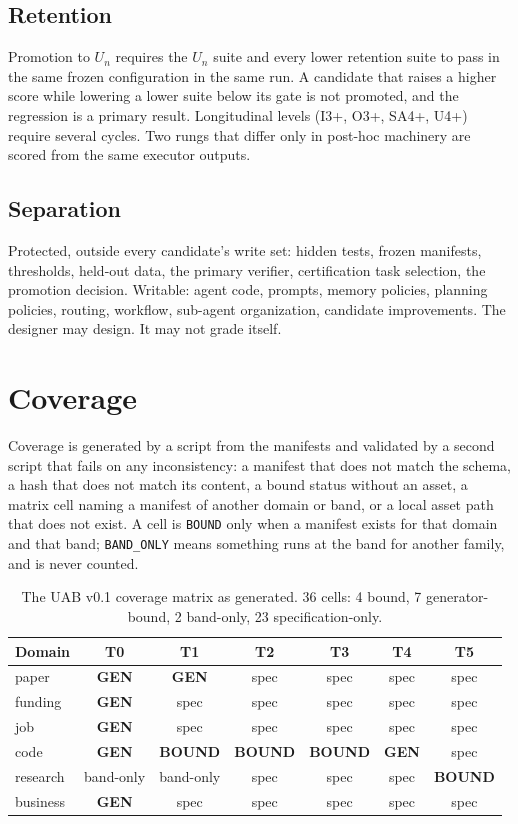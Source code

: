 \documentclass[11pt]{article}
\theoremstyle{definition}
\begin{document}
\subsection{Retention}

Promotion to $U_n$ requires the $U_n$ suite and every lower retention suite to pass in the same frozen configuration in the same run. A candidate that raises a higher score while lowering a lower suite below its gate is not promoted, and the regression is a primary result. Longitudinal levels (I3+, O3+, SA4+, U4+) require several cycles. Two rungs that differ only in post-hoc machinery are scored from the same executor outputs.

\subsection{Separation}

Protected, outside every candidate's write set: hidden tests, frozen manifests, thresholds, held-out data, the primary verifier, certification task selection, the promotion decision. Writable: agent code, prompts, memory policies, planning policies, routing, workflow, sub-agent organization, candidate improvements. The designer may design. It may not grade itself.

\section{Coverage}\label{sec:coverage}

Coverage is generated by a script from the manifests and validated by a second script that fails on any inconsistency: a manifest that does not match the schema, a hash that does not match its content, a bound status without an asset, a matrix cell naming a manifest of another domain or band, or a local asset path that does not exist. A cell is \texttt{BOUND} only when a manifest exists for that domain and that band; \texttt{BAND\_ONLY} means something runs at the band for another family, and is never counted.

\begin{table}[H]
\centering\small
\begin{tabularx}{\textwidth}{@{}lcccccc@{}}
\toprule
Domain & T0 & T1 & T2 & T3 & T4 & T5 \\
\midrule
paper & \textbf{GEN} & \textbf{GEN} & spec & spec & spec & spec \\
funding & \textbf{GEN} & spec & spec & spec & spec & spec \\
job & \textbf{GEN} & spec & spec & spec & spec & spec \\
code & \textbf{GEN} & \textbf{BOUND} & \textbf{BOUND} & \textbf{BOUND} & \textbf{GEN} & spec \\
research & band-only & band-only & spec & spec & spec & \textbf{BOUND} \\
business & \textbf{GEN} & spec & spec & spec & spec & spec \\
\bottomrule
\end{tabularx}
\caption{The UAB v0.1 coverage matrix as generated. 36 cells: 4 bound, 7 generator-bound, 2 band-only, 23 specification-only.}
\label{tab:matrix}
\end{table}
\end{document}
